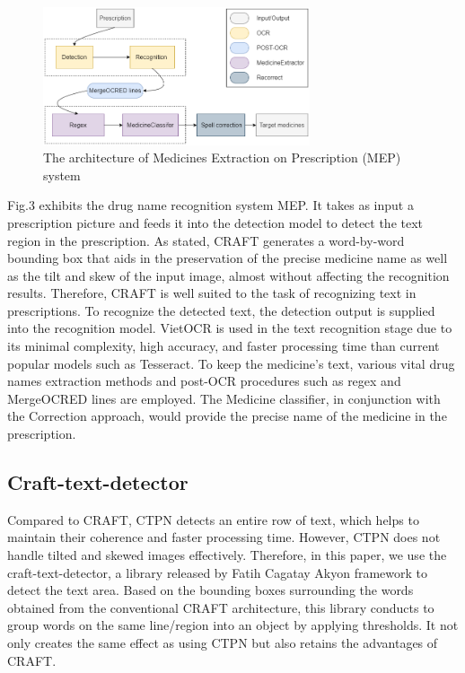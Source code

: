 \begin{figure}
\centering
\includegraphics[width=0.7\textwidth]{method/proposed_method.png}
\caption{The architecture of Medicines Extraction on Prescription (MEP) system}\label{fig_proposed}
\end{figure}

Fig.3 exhibits the drug name recognition system MEP. It takes as input a prescription picture and feeds it into the detection model to detect the text region in the prescription. As stated, CRAFT generates a word-by-word bounding box that aids in the preservation of the precise medicine name as well as the tilt and skew of the input image, almost without affecting the recognition results. Therefore, CRAFT is well suited to the task of recognizing text in prescriptions. To recognize the detected text, the detection output is supplied into the recognition model. VietOCR is used in the text recognition stage due to its minimal complexity, high accuracy, and faster processing time than current popular models such as Tesseract. To keep the medicine's text, various vital drug names extraction methods and post-OCR procedures such as regex and MergeOCRED lines are employed. The Medicine classifier, in conjunction with the Correction approach, would provide the precise name of the medicine in the prescription.
\subsection{Craft-text-detector}
Compared to CRAFT, CTPN detects an entire row of text, which helps to maintain their coherence and faster processing time. However, CTPN does not handle tilted and skewed images effectively. Therefore, in this paper, we use the craft-text-detector, a library released by Fatih Cagatay Akyon framework to detect the text area. Based on the bounding boxes surrounding the words obtained from the conventional CRAFT architecture, this library conducts to group words on the same line/region into an object by applying thresholds. It not only creates the same effect as using CTPN but also retains the advantages of CRAFT.
